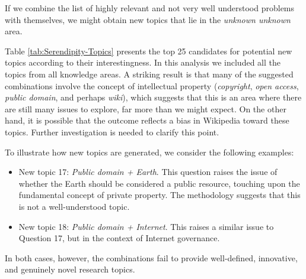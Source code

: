 If we combine the list of highly relevant and not very well understood problems with themselves, we might obtain new topics that lie in the \emph{unknown unknown} area.

Table \ref{tab:Serendipity-Topics} presents the top 25 candidates for potential new topics according to their interestingness. In this analysis we included all the topics from all knowledge areas. A striking result is that many of the suggested combinations involve the concept of intellectual property (\emph{copyright}, \emph{open access}, \emph{public domain}, and perhaps \emph{wiki}), which suggests that this is an area where there are still many issues to explore, far more than we might expect. On the other hand, it is possible that the outcome reflects a bias in Wikipedia toward these topics. Further investigation is needed to clarify this point.

To illustrate how new topics are generated, we consider the following examples:

\begin{itemize}
\item New topic 17: \emph{Public domain + Earth}. This question raises the issue of whether the Earth should be considered a public resource, touching upon the fundamental concept of private property. The methodology suggests that this is not a well-understood topic.
\item New topic 18: \emph{Public domain + Internet}. This raises a similar issue to Question 17, but in the context of Internet governance.
\end{itemize}

In both cases, however, the combinations fail to provide well-defined, innovative, and genuinely novel research topics.

